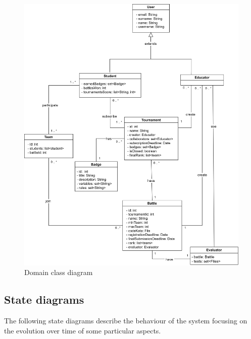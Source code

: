 \begin{figure}[H]
    \centering
    \includegraphics[scale=0.7]{images/class_diagram.png}
    \caption{Domain class diagram}
    \label{fig:class_diagram}
\end{figure}
\clearpage

\subsection{State diagrams}
The following state diagrams describe the behaviour of the system focusing on the evolution over time of some particular aspects. 

